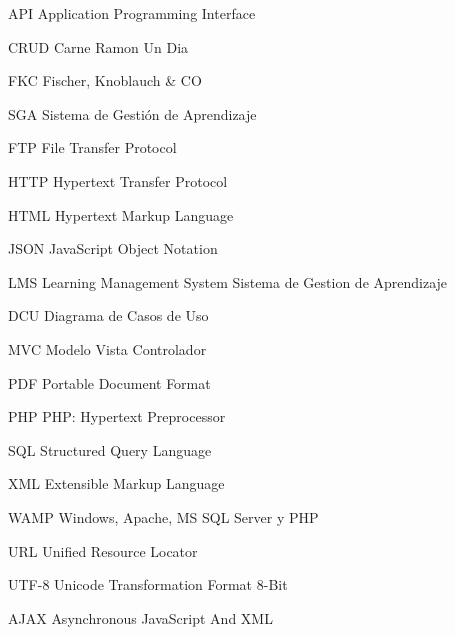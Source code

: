 	{API}
	{Application Programming Interface}

	{CRUD}
	{Carne Ramon Un Dia}

	{FKC}
	{Fischer, Knoblauch \& CO}

	{SGA}
	{Sistema de Gestión de Aprendizaje}

	{FTP}
	{File Transfer Protocol}

	{HTTP}
	{Hypertext Transfer Protocol}

	{HTML}
	{Hypertext Markup Language}

	{JSON}
	{JavaScript Object Notation}

	{LMS}
	{Learning Management System Sistema de Gestion de Aprendizaje}

	{DCU}
	{Diagrama de Casos de Uso}

	{MVC}
	{Modelo Vista Controlador}

	{PDF}
	{Portable Document Format}

	{PHP}
	{PHP: Hypertext Preprocessor}

	{SQL}
	{Structured Query Language}

	{XML}
	{Extensible Markup Language}

	{WAMP}
	{Windows, Apache, MS SQL Server y PHP}

	{URL}
	{Unified Resource Locator}

	{UTF-8}
	{Unicode Transformation Format 8-Bit}

	{AJAX}
	{Asynchronous JavaScript And XML}

